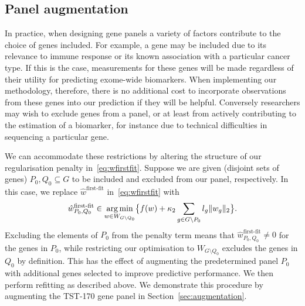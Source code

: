 \documentclass[../thesis.tex]{subfiles}
\begin{document}
\subsection{Panel augmentation \label{sec:panelaugmentation}}
In practice, when designing gene panels a variety of factors contribute to the choice of genes included. For example, a gene may be included due to its relevance to immune response or its known association with a particular cancer type. If this is the case, measurements for these genes will be made regardless of their utility for predicting exome-wide biomarkers. When implementing our methodology, therefore, there is no additional cost to incorporate observations from these genes into our prediction if they will be helpful. Conversely researchers may wish to exclude genes from a panel, or at least from actively contributing to the estimation of a biomarker, for instance due to technical difficulties in sequencing a particular gene. 

We can accommodate these restrictions by altering the structure of our regularisation penalty in~\eqref{eq:wfirstfit}.  Suppose we are given (disjoint sets of genes) $P_0, Q_0 \subseteq G$ to be included and excluded from our panel, respectively. In this case, we replace $\hat{w}^{\text{first-fit}}$ in~\eqref{eq:wfirstfit} with 
\begin{equation} \label{eq:augment}
\hat{w}_{P_0, Q_0}^{\text{first-fit}} \in \operatorname*{arg\,min}\limits_{w \in W_{G \setminus Q_0}} \bigl\{ f(w) + \kappa_2 \sum_{g \in G\setminus P_0} l_g \|w_g\|_2 \bigr\}.  
\end{equation}
Excluding the elements of $P_0$ from the penalty term means that $\hat{w}_{P_0, Q_0}^{\text{first-fit}} \neq 0$ for the genes in $P_0$, while restricting our optimisation to $W_{G \setminus Q_0}$ excludes the genes in $Q_0$ by definition. This has the effect of augmenting the predetermined panel $P_0$ with additional genes selected to improve predictive performance. We then perform refitting as described above. We demonstrate this procedure by augmenting the TST-170 gene panel in Section~\ref{sec:augmentation}.
\end{document}
